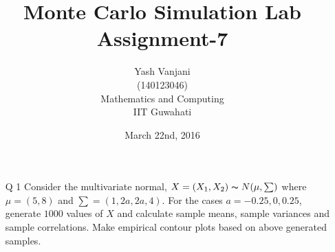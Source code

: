 \documentclass[12pt]{book}
\begin{document}
\title{\textbf{Monte Carlo Simulation Lab Assignment-7}}
\author{Yash Vanjani\\(140123046)\\Mathematics and Computing\\IIT Guwahati}
\date{March 22nd, 2016}

\maketitle

\newpage
\begin{enumerate}
\item[Q 1] Consider the multivariate normal, $X=(X_1, X_2)\thicksim N(\mu, \sum)$ where $\mu=(5, 8)$ and $\sum=(1, 2a, 2a, 4)$. For the cases $a = -0.25, 0, 0.25$, generate $1000$ values of $X$ and calculate sample means,
sample variances and sample correlations. Make empirical contour plots based on above
generated samples.
\end{enumerate}
\end{document}
